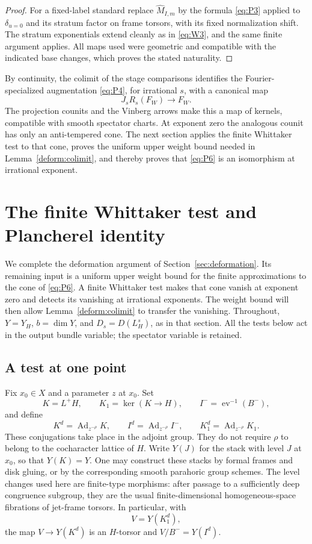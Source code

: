 \documentclass[11pt]{article}
\numberwithin{equation}{section}
\theoremstyle{definition}
\theoremstyle{remark}
\begin{document}
\begin{proof}
For a fixed-label standard replace
$\widehat M_{I,m}$ by the formula
\eqref{eq:P3} applied to $\delta_{u=0}$ and its
stratum factor on frame torsors, with its fixed
normalization shift.  The stratum exponentials
extend cleanly as in \eqref{eq:W3}, and the same
finite argument applies.  All maps used were
geometric and compatible with the indicated
base changes, which proves the stated naturality.
\end{proof}

By continuity, the colimit of the stage comparisons
identifies the Fourier-specialized augmentation
\eqref{eq:P4}, for irrational $s$, with a canonical
map
\begin{equation}\label{eq:P6}
                         J_sR_s(F_W)\longrightarrow F_W.
\end{equation}
The projection counits and the Vinberg arrows make
this a map of kernels, compatible with smooth
spectator charts.  At exponent zero the analogous
counit has only an anti-tempered cone.  The next
section applies the finite Whittaker test to that
cone, proves the uniform upper weight bound needed
in Lemma~\ref{deform:colimit}, and thereby proves
that \eqref{eq:P6} is an isomorphism at irrational
exponent.

\section{The finite Whittaker test and Plancherel identity}
\label{sec:plancherel}

We complete the deformation argument of Section~\ref{sec:deformation}.
Its remaining input is a uniform upper weight bound for the finite
approximations to the cone of \eqref{eq:P6}.  A finite Whittaker test makes
that cone vanish at exponent zero and detects its vanishing at irrational
exponents.  The weight bound will then allow Lemma~\ref{deform:colimit} to
transfer the vanishing.  Throughout, $Y=Y_H$, $b=\dim Y$, and
$D_s=D(L_H^s)$, as in that section.  All the tests below act in the output
bundle variable; the spectator variable is retained.

\subsection{A test at one point}
\label{planch:finite-test-construction}

Fix $x_0\in X$ and a parameter $z$ at $x_0$.  Set
\[
 K=L^+H,\qquad K_1=\ker(K\longrightarrow H),\qquad
 I^-=\operatorname{ev}^{-1}(B^-),
\]
and define
\[
 K^d=\operatorname{Ad}_{z^{-\rho}}K,\qquad
 I^d=\operatorname{Ad}_{z^{-\rho}}I^-,\qquad
 K^d_1=\operatorname{Ad}_{z^{-\rho}}K_1.
\]
These conjugations take place in the adjoint group.  They do not require
$\rho$ to belong to the cocharacter lattice of $H$.
Write $Y(J)$ for the stack with level $J$ at $x_0$, so that $Y(K)=Y$.
One may construct these stacks by formal frames and disk gluing, or by the
corresponding smooth parahoric group schemes.  The level changes used here
are finite-type morphisms: after passage to a sufficiently deep congruence
subgroup, they are the usual finite-dimensional homogeneous-space
fibrations of jet-frame torsors.  In particular, with
\[
 V=Y(K^d_1),
\]
the map $V\to Y(K^d)$ is an $H$-torsor and $V/B^-=Y(I^d)$.
\end{document}
